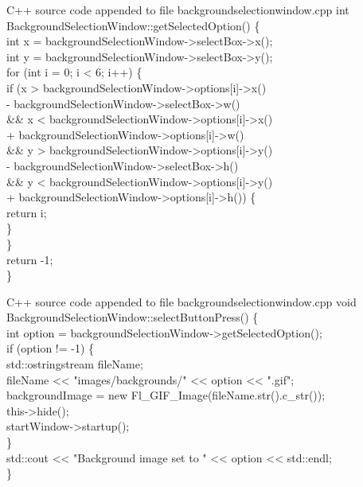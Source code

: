 \documentclass{article}
\begin{document}
\begin{GFT}{C++ source code appended to file backgroundselectionwindow.cpp}
\+int BackgroundSelectionWindow::getSelectedOption() \{\\
\+    int x = backgroundSelectionWindow->selectBox->x();\\
\+    int y = backgroundSelectionWindow->selectBox->y();\\
\+    for (int i = 0; i < 6; i++) \{\\
\+        if (x > backgroundSelectionWindow->options[i]->x()\\
\+                - backgroundSelectionWindow->selectBox->w()\\
\+         \&\& x < backgroundSelectionWindow->options[i]->x()\\
\+                + backgroundSelectionWindow->options[i]->w()\\
\+         \&\& y > backgroundSelectionWindow->options[i]->y()\\
\+                - backgroundSelectionWindow->selectBox->h()\\
\+         \&\& y < backgroundSelectionWindow->options[i]->y()\\
\+                + backgroundSelectionWindow->options[i]->h()) \{\\
\+            return i;\\
\+        \}\\
\+    \}\\
\+    return -1;\\
\+\}\\
\end{GFT}
\clearpage
\begin{GFT}{C++ source code appended to file backgroundselectionwindow.cpp}
\+void BackgroundSelectionWindow::selectButtonPress() \{\\
\+    int option = backgroundSelectionWindow->getSelectedOption();\\
\+    if (option != -1) \{\\
\+        std::ostringstream fileName;\\
\+        fileName << "images/backgrounds/" << option << ".gif";\\
\+        backgroundImage = new Fl\_GIF\_Image(fileName.str().c\_str());\\
\+        this->hide();\\
\+        startWindow->startup();\\
\+    \}\\
\+    std::cout << "Background image set to " << option << std::endl;\\
\+\}\\
\end{GFT}
\end{document}
